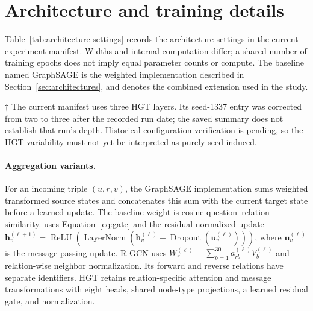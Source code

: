 \section{Architecture and training details}
\label{app:architectures}

Table~\ref{tab:architecture-settings} records the architecture settings in the current experiment manifest. Widths and internal computation differ; a shared number of training epochs does not imply equal parameter counts or compute. The baseline named GraphSAGE is the weighted implementation described in Section~\ref{sec:architectures}, and \method{} denotes the combined extension used in the study.

\begin{table}[h]
 \centering
 \caption{Fixed retrieval configurations. ``3/3/3'' denotes ReaRev's instructions, reasoning steps, and adaptive iterations, respectively. Dropout 0.1 is explicitly configured for the first five models; NBFNet uses its fixed path-propagation implementation. Settings are reproduced from the experiment manifest.}
 \label{tab:architecture-settings}
 
 \par\smallskip
 {\footnotesize\raggedright $\dagger$ The current manifest uses three HGT layers. Its seed-1337 entry was corrected from two to three after the recorded run date; the saved summary does not establish that run's depth. Historical configuration verification is pending, so the HGT variability must not yet be interpreted as purely seed-induced.\par}
\end{table}

\paragraph{Aggregation variants.}
For an incoming triple $(u,r,v)$, the GraphSAGE implementation sums weighted transformed source states and concatenates this sum with the current target state before a learned update. The baseline weight is cosine question--relation similarity. \method{} uses Equation~\ref{eq:gate} and the residual-normalized update $\mathbf h_v^{(\ell+1)}=\operatorname{ReLU}(\operatorname{LayerNorm}(\mathbf h_v^{(\ell)}+\operatorname{Dropout}(\mathbf u_v^{(\ell)})))$, where $\mathbf u_v^{(\ell)}$ is the message-passing update. R-GCN uses $W_r^{(\ell)}=\sum_{b=1}^{30}a_{rb}^{(\ell)}V_b^{(\ell)}$ and relation-wise neighbor normalization. Its forward and reverse relations have separate identifiers. HGT retains relation-specific attention and message transformations with eight heads, shared node-type projections, a learned residual gate, and normalization.

